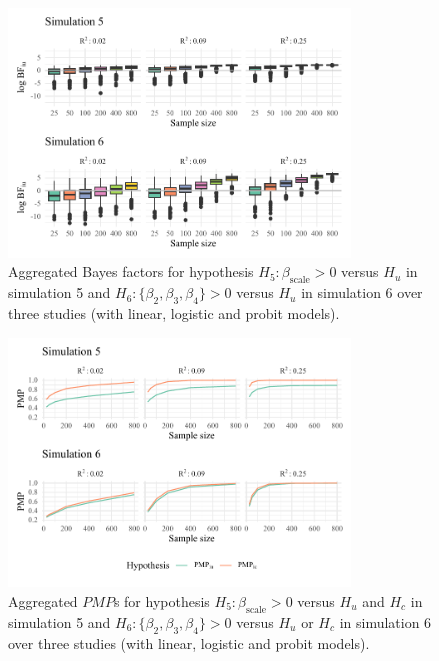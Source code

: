 \documentclass[
  authoryear,
  preprint,
  5p,
  twocolumn]{elsarticle}
\begin{document}
\begin{figure}

{\centering \includegraphics[width=0.81\textwidth,height=\textheight]{manuscript_volker_files/figure-pdf/fig-sim56-1.pdf}

}

\caption{\label{fig-sim56-1}Aggregated Bayes factors for hypothesis
\(H_5: \beta_{\text{scale}} > 0\) versus \(H_u\) in simulation 5 and
\(H_6: \{\beta_2, \beta_3, \beta_4\} > 0\) versus \(H_u\) in simulation
6 over three studies (with linear, logistic and probit models).}

\end{figure}

\begin{figure}

{\centering \includegraphics[width=0.81\textwidth,height=\textheight]{manuscript_volker_files/figure-pdf/fig-sim56-2.pdf}

}

\caption{\label{fig-sim56-2}Aggregated \(PMP\)s for hypothesis
\(H_5: \beta_{\text{scale}} > 0\) versus \(H_u\) and \(H_c\) in
simulation 5 and \(H_6: \{\beta_2, \beta_3, \beta_4\} > 0\) versus
\(H_u\) or \(H_c\) in simulation 6 over three studies (with linear,
logistic and probit models).}

\end{figure}
\end{document}
